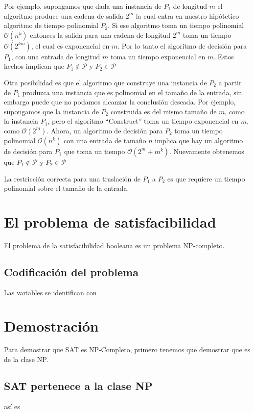 \documentclass[a4paper]{article}
\begin{document}
Por ejemplo, supongamos que dada una instancia de $P_1$ de longitud $m$ el algoritmo produce una cadena de salida $2^{m}$ la cual entra en nuestro hipótetico algoritmo de tiempo polinomial $P_2$. Si ese algoritmo toma un tiempo polinomial $\mathcal{O}(n^k)$ entonces la salida para una cadena de longitud $2^{m}$ toma un tiempo $\mathcal{O}(2^{km})$, el cual es exponencial en $m$. Por lo tanto el algoritmo de decisión para $P_1$, con una entrada de longitud $m$ toma un tiempo exponencial en $m$. Estos hechos implican que $P_1 \notin \mathcal{P}$ y $P_2 \in \mathcal{P}$

Otra posibilidad es que el algoritmo que construye una instancia de $P_2$ a partir de $P_1$ produzca una instancia que es polinomial en el tamaño de la entrada, sin embargo puede que no podamos alcanzar la conclusión deseada. Por ejemplo, supongamos que la instancia de $P_2$ construida es del mismo tamaño de $m$, como la instancia $P_1$, pero el algoritmo ``Construct'' toma un tiempo exponencial en $m$, como $\mathcal{O}(2^{m})$. Ahora, un algoritmo de decisión para $P_2$ toma un tiempo polinomial $\mathcal{O}(n^{k})$ con una entrada de tamaño $n$ implica que hay un algoritmo de decisión para $P_1$ que toma un tiempo $\mathcal{O}(2^{m} + m^{k})$. Nuevamente obtenemos que $P_1 \notin \mathcal{P}$ y $P_2 \in \mathcal{P}$

La restricción correcta para una traslación de $P_1$ a $P_2$ es que requiere un tiempo polinomial sobre el tamaño de la entrada.

\section{El problema de satisfacibilidad}
El problema de la satisfacibilidad booleana es un problema NP-completo\cite{cook1971complexity}.



\subsection{Codificación del problema}

Las variables se identifican con

\section{Demostración}
Para demostrar que SAT es NP-Completo, primero tenemos que demostrar que es de la clase NP.

\subsection{SAT pertenece a la clase NP}
así es
\end{document}
